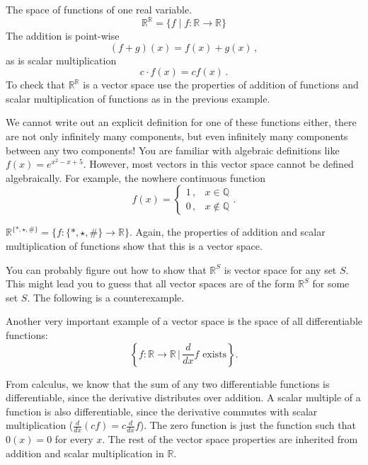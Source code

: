 \begin{example} The space of functions of one real variable.\\
\[ \mathbb{R}^{\mathbb{R}} = \{f \mid f \colon \mathbb{R} \to \mathbb{R} \} \]
The addition is point-wise \[(f+g)(x)=f(x)+g(x)\, ,\] as is scalar multiplication \[c\cdot f(x)=cf(x)\, .\]  
To check that $\mathbb{R}^{\mathbb{R}}$ is a vector space use the properties of addition of functions and scalar multiplication of functions as in the previous example. 


We cannot write out an explicit definition for one of these functions either, there are not only infinitely many components, but even infinitely many components between any two components!  
You are familiar with algebraic definitions like $f(x)=e^{x^2-x+5}$. However, most vectors in this vector space cannot be defined algebraically. For example, the nowhere continuous function 
\begin{displaymath}
   f(x) = \left\{
     \begin{array}{lr}
       1\, , & x \in \mathbb{Q}\\[2mm]
       0\, , &  x \notin \mathbb{Q}
     \end{array}
   \right. .
\end{displaymath} 
\end{example}

\begin{example} $\mathbb{R}^{ \{*, \star, \# \}} = \{ f : \{*, \star, \# \} \to \mathbb{R} \}$. Again, the properties of addition and scalar multiplication of functions show that this is a vector space.
\end{example}

You can probably figure out how to show that $\mathbb{R}^S$ is vector space for any set $S$.  
This might lead you to guess that all vector spaces are of the form $\mathbb{R}^S$ for some set $S$. The following is a counterexample. 

\begin{example}
Another very important example of a vector space is the space of all differentiable functions: 
\[
\left\{ f \colon \mathbb{R}\rightarrow \mathbb{R} \, \Big|\, \frac{d}{dx}f \text{ exists} \right\}.
\]

From calculus, we know that the sum of any two differentiable functions is differentiable, since the derivative distributes over addition.  A scalar multiple of a function is also differentiable, since the derivative commutes with scalar multiplication ($\frac{d}{d x}(cf)=c\frac{d}{dx}f$).  The zero function is just the function such that $0(x)=0$ for every $x$.  The rest of the vector space properties are inherited from addition and scalar multiplication in $\mathbb{R}$.
\end{example}

